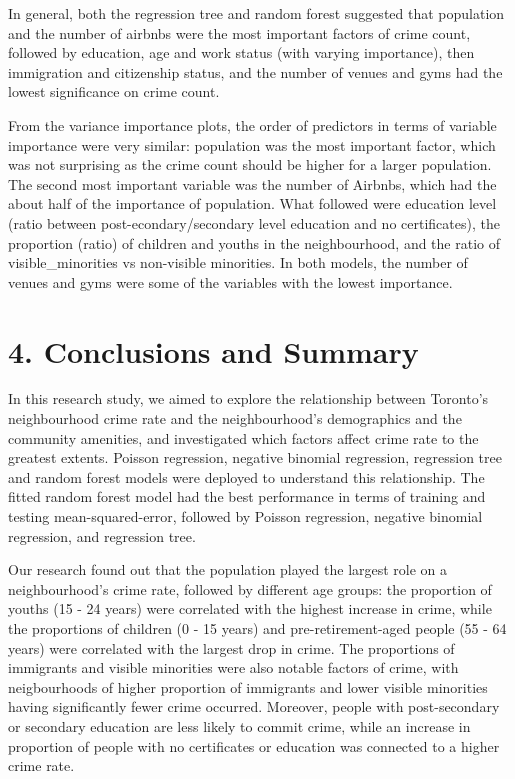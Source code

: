 \documentclass[
]{article}
\begin{document}
In general, both the regression tree and random forest suggested that
population and the number of airbnbs were the most important factors of
crime count, followed by education, age and work status (with varying
importance), then immigration and citizenship status, and the number of
venues and gyms had the lowest significance on crime count.

From the variance importance plots, the order of predictors in terms of
variable importance were very similar: population was the most important
factor, which was not surprising as the crime count should be higher for
a larger population. The second most important variable was the number
of Airbnbs, which had the about half of the importance of population.
What followed were education level (ratio between
post-econdary/secondary level education and no certificates), the
proportion (ratio) of children and youths in the neighbourhood, and the
ratio of visible\_minorities vs non-visible minorities. In both models,
the number of venues and gyms were some of the variables with the lowest
importance.

\hypertarget{conclusions-and-summary}{%
\section{4. Conclusions and Summary}\label{conclusions-and-summary}}

In this research study, we aimed to explore the relationship between
Toronto's neighbourhood crime rate and the neighbourhood's demographics
and the community amenities, and investigated which factors affect crime
rate to the greatest extents. Poisson regression, negative binomial
regression, regression tree and random forest models were deployed to
understand this relationship. The fitted random forest model had the
best performance in terms of training and testing mean-squared-error,
followed by Poisson regression, negative binomial regression, and
regression tree.

Our research found out that the population played the largest role on a
neighbourhood's crime rate, followed by different age groups: the
proportion of youths (15 - 24 years) were correlated with the highest
increase in crime, while the proportions of children (0 - 15 years) and
pre-retirement-aged people (55 - 64 years) were correlated with the
largest drop in crime. The proportions of immigrants and visible
minorities were also notable factors of crime, with neigbourhoods of
higher proportion of immigrants and lower visible minorities having
significantly fewer crime occurred. Moreover, people with post-secondary
or secondary education are less likely to commit crime, while an
increase in proportion of people with no certificates or education was
connected to a higher crime rate.
\end{document}
